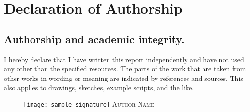 \newpage
\justifying
\section*{Declaration of Authorship}

\subsection*{Authorship and academic integrity.}

I hereby declare that I have written this report independently and have not used any other than the specified resources. The parts of the work that are taken from other works in wording or meaning are indicated by references and sources. This also applies to drawings, sketches, example scripts, and the like.

\begin{figure}[h]
    \hfill\begin{minipage}{4cm}
        \centering
        \texttt{[image: sample-signature]}
        \textsc{Author Name}\hspace{0.5cm}
    \end{minipage}\hspace{1cm}
\end{figure}